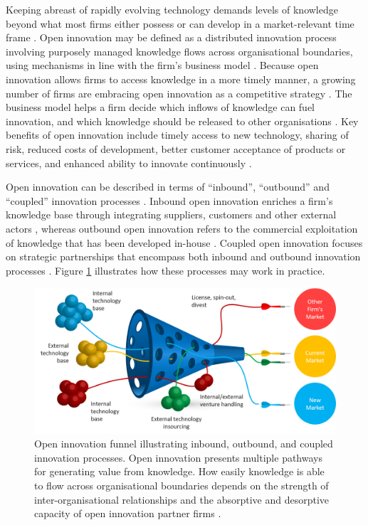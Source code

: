 Keeping abreast of rapidly evolving technology demands levels of knowledge beyond what most firms either possess or can develop in a market\hyp{}relevant time frame \citep{enkel2009open}. Open innovation may be defined as a distributed innovation process involving purposely managed knowledge flows across organisational boundaries, using mechanisms in line with the firm's business model \citep{chesbrough2014explicating}. Because open innovation allows firms to access knowledge in a more timely manner, a growing number of firms are embracing open innovation as a competitive strategy \citep{stanko2017under}. The business model helps a firm decide which inflows of knowledge can fuel innovation, and which knowledge should be released to other organisations \citep{chesbrough2017future}. Key benefits of open innovation include timely access to new technology, sharing of risk, reduced costs of development, better customer acceptance of products or services, and enhanced ability to innovate continuously \citep{ye2013exploring}. \medskip
 
 Open innovation can be described in terms of \enquote{inbound}, \enquote{outbound} and \enquote{coupled} innovation processes \citep{gassmann2004towards}. Inbound open innovation enriches a firm’s knowledge base through integrating suppliers, customers and other external actors \citep{xu2013inbound}, whereas outbound open innovation refers to the commercial exploitation of knowledge that has been developed in-house \citep{de2016knowledge}. Coupled open innovation focuses on strategic partnerships that encompass both inbound and outbound innovation processes \citep{spithoven2013open}. Figure \ref{fig:oi_funnel} illustrates how these processes may work in practice. \medskip

\begin{figure}
	\centering
	\includegraphics[width=0.9\linewidth]{Images/oi_funnel.png}
	\caption{Open innovation funnel illustrating inbound, outbound, and coupled innovation processes. Open innovation presents multiple pathways for generating value from knowledge. How easily knowledge is able to flow across organisational boundaries depends on the strength of inter-organisational relationships and the absorptive and desorptive capacity of open innovation partner firms \citep{chesbrough2004open,lichtenthaler2010technology}.} 
	\label{fig:oi_funnel}
\end{figure}

